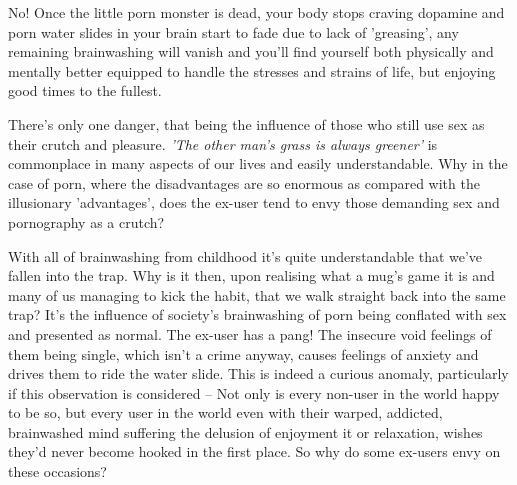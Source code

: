 \documentclass[easypeasy.tex]{subfiles}
\begin{document}
No! Once the little porn monster is dead, your body stops craving dopamine and porn water slides in your brain start to fade due to lack of 'greasing', any remaining brainwashing will vanish and you'll find yourself both physically and mentally better equipped to handle the stresses and strains of life, but enjoying good times to the fullest.

There's only one danger, that being the influence of those who still use sex as their crutch and pleasure. \textit{'The other man's grass is always greener'} is commonplace in many aspects of our lives and easily understandable. Why in the case of porn, where the disadvantages are so enormous as compared with the illusionary 'advantages', does the ex-user tend to envy those demanding sex and pornography as a crutch?

With all of brainwashing from childhood it's quite understandable that we've fallen into the trap. Why is it then, upon realising what a mug's game it is and many of us managing to kick the habit, that we walk straight back into the same trap? It's the influence of society's brainwashing of porn being conflated with sex and presented as normal. The ex-user has a pang! The insecure void feelings of them being single, which isn't a crime anyway, causes feelings of anxiety and drives them to ride the water slide. This is indeed a curious anomaly, particularly if this observation is considered -- Not only is every non-user in the world happy to be so, but every user in the world even with their warped, addicted, brainwashed mind suffering the delusion of enjoyment it or relaxation, wishes they'd never become hooked in the first place. So why do some ex-users envy on these occasions?
\end{document}
